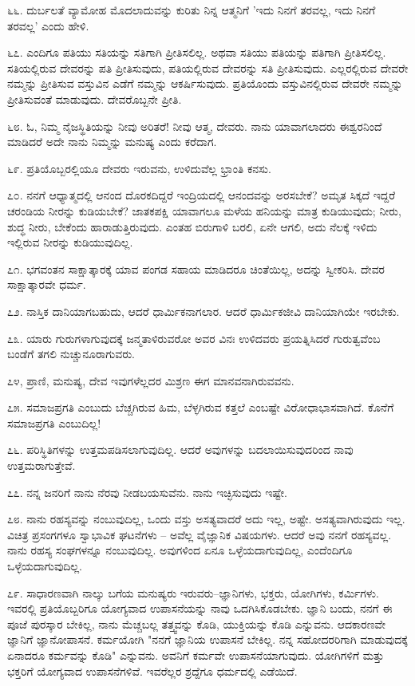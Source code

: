 ೬೬. ದುರ್ಬಲತೆ ವ್ಯಾಮೋಹ ಮೊದಲಾದುವನ್ನು ಕುರಿತು ನಿನ್ನ ಆತ್ಮನಿಗೆ 'ಇದು ನಿನಗೆ ತರವಲ್ಲ, ಇದು ನಿನಗೆ ತರವಲ್ಲ' ಎಂದು ಹೇಳಿ.

೬೭. ಎಂದಿಗೂ ಪತಿಯು ಸತಿಯನ್ನು ಸತಿಗಾಗಿ ಪ್ರೀತಿಸಲಿಲ್ಲ. ಅಥವಾ ಸತಿಯು ಪತಿಯನ್ನು ಪತಿಗಾಗಿ ಪ್ರೀತಿಸಲಿಲ್ಲ. ಸತಿಯಲ್ಲಿರುವ ದೇವರನ್ನು ಪತಿ ಪ್ರೀತಿಸುವುದು, ಪತಿಯಲ್ಲಿರುವ ದೇವರನ್ನು ಸತಿ ಪ್ರೀತಿಸುವುದು. ಎಲ್ಲರಲ್ಲಿರುವ ದೇವರೇ ನಮ್ಮನ್ನು ಪ್ರೀತಿಸುವ ವಸ್ತುವಿನ ಎಡೆಗೆ ನಮ್ಮನ್ನು ಆಕರ್ಷಿಸುವುದು. ಪ್ರತಿಯೊಂದು ವಸ್ತುವಿನಲ್ಲಿರುವ ದೇವರೇ ನಮ್ಮನ್ನು ಪ್ರೀತಿಸುವಂತೆ ಮಾಡುವುದು. ದೇವರೊಬ್ಬನೇ ಪ್ರೀತಿ.

೬೮. ಓ, ನಿಮ್ಮ ನೈಜಸ್ಥಿತಿಯನ್ನು ನೀವು ಅರಿತರೆ! ನೀವು ಆತ್ಮ, ದೇವರು. ನಾನು ಯಾವಾಗಲಾದರು ಈಶ್ವರನಿಂದೆ ಮಾಡಿದರೆ ಅದೇ ನಾನು ನಿಮ್ಮನ್ನು ಮನುಷ್ಯ ಎಂದು ಕರೆದಾಗ.

೬೯. ಪ್ರತಿಯೊಬ್ಬರಲ್ಲಿಯೂ ದೇವರು ಇರುವನು, ಉಳಿದುವೆಲ್ಲ ಭ್ರಾಂತಿ ಕನಸು.

೭೦. ನನಗೆ ಆಧ್ಯಾತ್ಮದಲ್ಲಿ ಆನಂದ ದೊರಕದಿದ್ದರೆ ಇಂದ್ರಿಯದಲ್ಲಿ ಆನಂದವನ್ನು ಅರಸಬೇಕೆ? ಅಮೃತ ಸಿಕ್ಕದೆ ಇದ್ದರೆ ಚರಂಡಿಯ ನೀರನ್ನು ಕುಡಿಯಬೇಕೆ? ಜಾತಕಪಕ್ಷಿ ಯಾವಾಗಲೂ ಮಳೆಯ ಹನಿಯನ್ನು ಮಾತ್ರ ಕುಡಿಯುವುದು; ನೀರು, ಶುದ್ಧ ನೀರು, ಬೇಕೆಂದು ಹಾರಾಡುತ್ತಿರುವುದು. ಎಂತಹ ಬಿರುಗಾಳಿ ಬರಲಿ, ಏನೇ ಆಗಲಿ, ಅದು ನೆಲಕ್ಕೆ ಇಳಿದು ಇಲ್ಲಿರುವ ನೀರನ್ನು ಕುಡಿಯುವುದಿಲ್ಲ.

೭೧. ಭಗವಂತನ ಸಾಕ್ಷಾತ್ಕಾರಕ್ಕೆ ಯಾವ ಪಂಗಡ ಸಹಾಯ ಮಾಡಿದರೂ ಚಿಂತೆಯಿಲ್ಲ, ಅದನ್ನು ಸ್ವೀಕರಿಸಿ. ದೇವರ ಸಾಕ್ಷಾತ್ಕಾರವೇ ಧರ್ಮ.

೭೨. ನಾಸ್ತಿಕ ದಾನಿಯಾಗಬಹುದು, ಆದರೆ ಧಾರ್ಮಿಕನಾಗಲಾರ. ಆದರೆ ಧಾರ್ಮಿಕಜೀವಿ ದಾನಿಯಾಗಿಯೇ ಇರಬೇಕು.

೭೩. ಯಾರು ಗುರುಗಳಾಗುವುದಕ್ಕೆ ಜನ್ಮತಾಳಿರುವರೋ ಅವರ ವಿನಃ ಉಳಿದವರು ಪ್ರಯತ್ನಿಸಿದರೆ ಗುರುತ್ವವೆಂಬ ಬಂಡೆಗೆ ತಗಲಿ ನುಚ್ಚುನೂರಾಗುವರು.

೭೪, ಪ್ರಾಣಿ, ಮನುಷ್ಯ, ದೇವ ಇವುಗಳೆಲ್ಲದರ ಮಿಶ್ರಣ ಈಗ ಮಾನವನಾಗಿರುವವನು.

೭೫. ಸಮಾಜಪ್ರಗತಿ ಎಂಬುದು ಬೆಚ್ಚಗಿರುವ ಹಿಮ, ಬೆಳ್ಳಗಿರುವ ಕತ್ತಲೆ ಎಂಬಷ್ಟೇ ವಿರೋಧಾಭಾಸವಾಗಿದೆ. ಕೊನೆಗೆ ಸಮಾಜಪ್ರಗತಿ ಎಂಬುದಿಲ್ಲ!

೭೬. ಪರಿಸ್ಥಿತಿಗಳನ್ನು ಉತ್ತಮಪಡಿಸಲಾಗುವುದಿಲ್ಲ. ಆದರೆ ಅವುಗಳನ್ನು ಬದಲಾಯಿಸುವುದರಿಂದ ನಾವು ಉತ್ತಮರಾಗುತ್ತೇವೆ.

೭೭. ನನ್ನ ಜನರಿಗೆ ನಾನು ನೆರವು ನೀಡಬಯಸುವೆನು. ನಾನು ಇಚ್ಛಿಸುವುದು ಇಷ್ಟೇ.

೭೮. ನಾನು ರಹಸ್ಯವನ್ನು ನಂಬುವುದಿಲ್ಲ, ಒಂದು ವಸ್ತು ಅಸತ್ಯವಾದರೆ ಅದು ಇಲ್ಲ, ಅಷ್ಟೇ. ಅಸತ್ಯವಾಗಿರುವುದು ಇಲ್ಲ. ವಿಚಿತ್ರ ಪ್ರಸಂಗಗಳೂ ಸ್ವಾಭಾವಿಕ ಘಟನೆಗಳು – ಅವೆಲ್ಲ ವೈಜ್ಞಾನಿಕ ವಿಷಯಗಳು. ಆದರೆ ಅವು ನನಗೆ ರಹಸ್ಯವಲ್ಲ. ನಾನು ರಹಸ್ಯ ಸಂಘಗಳನ್ನೂ ನಂಬುವುದಿಲ್ಲ. ಅವುಗಳಿಂದ ಏನೂ ಒಳ್ಳೆಯದಾಗುವುದಿಲ್ಲ, ಎಂದೆಂದಿಗೂ ಒಳ್ಳೆಯದಾಗುವುದಿಲ್ಲ.

೭೯. ಸಾಧಾರಣವಾಗಿ ನಾಲ್ಕು ಬಗೆಯ ಮನುಷ್ಯರು ಇರುವರು–ಜ್ಞಾನಿಗಳು, ಭಕ್ತರು, ಯೋಗಿಗಳು, ಕರ್ಮಿಗಳು. ಇವರಲ್ಲಿ ಪ್ರತಿಯೊಬ್ಬರಿಗೂ ಯೋಗ್ಯವಾದ ಉಪಾಸನೆಯನ್ನು ನಾವು ಒದಗಿಸಿಕೊಡಬೇಕು. ಜ್ಞಾನಿ ಬಂದು, ನನಗೆ ಈ ಪೂಜೆ ಪುರಸ್ಕಾರ ಬೇಕಿಲ್ಲ, ನಾನು ಮೆಚ್ಚಬಲ್ಲ ತತ್ತ್ವವನ್ನು ಕೊಡಿ, ಯುಕ್ತಿಯನ್ನು ಕೊಡಿ ಎನ್ನುವನು. ಆದಕಾರಣವೇ ಜ್ಞಾನಿಗೆ ಜ್ಞಾನೋಪಾಸನೆ. ಕರ್ಮಯೋಗಿ "ನನಗೆ ಜ್ಞಾನಿಯ ಉಪಾಸನೆ ಬೇಕಿಲ್ಲ. ನನ್ನ ಸಹೋದರರಿಗಾಗಿ ಮಾಡುವುದಕ್ಕೆ ಏನಾದರೂ ಕರ್ಮವನ್ನು ಕೊಡಿ" ಎನ್ನುವನು. ಅವನಿಗೆ ಕರ್ಮವೇ ಉಪಾಸನೆಯಾಗುವುದು. ಯೋಗಿಗಳಿಗೆ ಮತ್ತು ಭಕ್ತರಿಗೆ ಯೋಗ್ಯವಾದ ಉಪಾಸನೆಗಳಿವೆ. ಇವರೆಲ್ಲರ ಶ್ರದ್ದೆಗೂ ಧರ್ಮದಲ್ಲಿ ಎಡೆಯಿದೆ.

